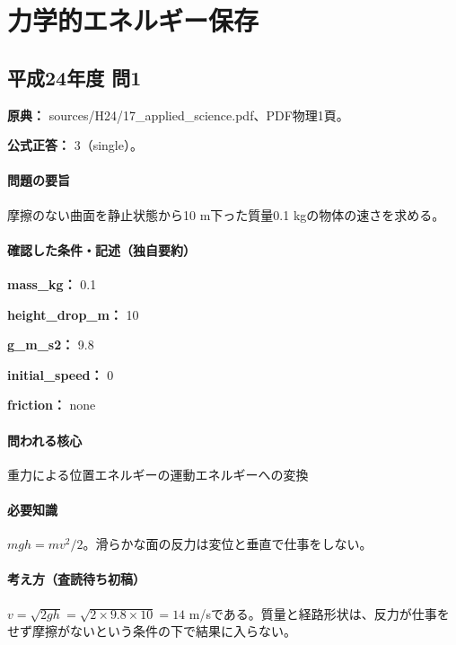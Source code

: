 \section{力学的エネルギー保存}

\subsection{平成24年度 問1}
\label{q:h24-reg-applied-01}

\noindent\textbf{原典：} sources/H24/17\_applied\_science.pdf、PDF物理1頁。

\textbf{公式正答：} 3（single）。

\paragraph{問題の要旨} 摩擦のない曲面を静止状態から10 m下った質量0.1 kgの物体の速さを求める。

\paragraph{確認した条件・記述（独自要約）}\mbox{}\par

\noindent\textbf{mass\_kg：} 0.1\par

\noindent\textbf{height\_drop\_m：} 10\par

\noindent\textbf{g\_m\_s2：} 9.8\par

\noindent\textbf{initial\_speed：} 0\par

\noindent\textbf{friction：} none\par

\paragraph{問われる核心} 重力による位置エネルギーの運動エネルギーへの変換

\paragraph{必要知識} \(mgh=mv^2/2\)。滑らかな面の反力は変位と垂直で仕事をしない。

\paragraph{考え方（査読待ち初稿）} \(v=\sqrt{2gh}=\sqrt{2\times9.8\times10}=14\) m/sである。質量と経路形状は、反力が仕事をせず摩擦がないという条件の下で結果に入らない。

